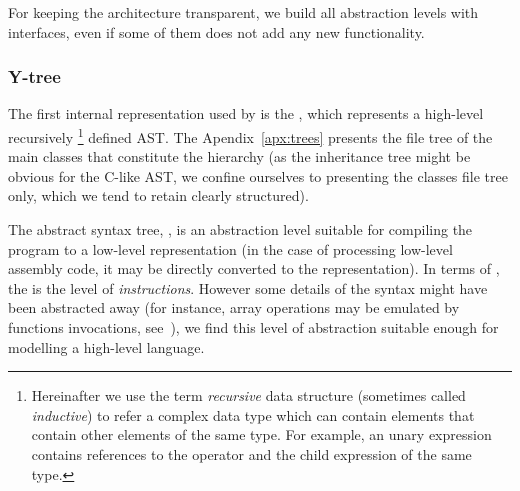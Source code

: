 
For keeping the architecture transparent, we build all abstraction levels with interfaces, even if some of them does not add any new functionality.%

\subsubsection{Y-tree}
\label{ch:impl:model:ytree}

The first internal representation used by \porthos[2] is the \textit{\ytree{}}, which represents a high-level recursively%
%
\footnote{Hereinafter we use the term \textit{recursive} data structure (sometimes called \textit{inductive}) to refer a complex data type which can contain elements that contain other elements of the same type.
For example, an unary expression contains references to the operator and the child expression of the same type.} %
%
defined AST.
The Apendix~\ref{apx:trees} presents the file tree of the main classes that constitute the \ytree{} hierarchy (as the inheritance tree might be obvious for the C-like AST, we confine ourselves to presenting the classes file tree only, which we tend to retain clearly structured).

The abstract syntax tree, \ytree{}, is an abstraction level suitable for compiling the program to a low-level representation (in the case of processing low-level assembly code, it may be directly converted to the \xgraph{} representation).
In terms of \porthos[1], the \ytree{} is the level of \textit{instructions}.
However some details of the syntax might have been abstracted away (for instance, array operations may be emulated by functions invocations, see~\cite[Chapter 5]{gries2012science}), we find this level of abstraction suitable enough for modelling a high-level language.

